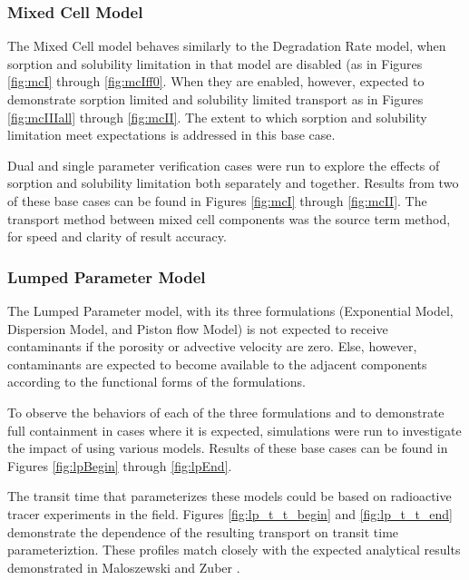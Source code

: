 \subsubsection{Mixed Cell Model}
The Mixed Cell model behaves similarly to the Degradation Rate 
model, when sorption and solubility limitation in that model are disabled (as 
in Figures \ref{fig:mcI} through \ref{fig:mcIff0}. When they are 
enabled, however, expected to demonstrate sorption limited and solubility 
limited transport as in Figures \ref{fig:mcIIIall} through \ref{fig:mcII}. The extent to which sorption and solubility limitation meet 
expectations is addressed in this base case.

Dual and single parameter verification cases were run to explore the effects of 
sorption and solubility limitation both separately and together.  Results from 
two of these base cases can be found in Figures \ref{fig:mcI} through 
\ref{fig:mcII}. The transport method between mixed cell components was the 
source term method, for speed and clarity of result accuracy.


\FloatBarrier

\subsubsection{Lumped Parameter Model}
The Lumped Parameter model, with its three formulations (Exponential Model, 
Dispersion Model, and Piston flow Model) is not expected to receive 
contaminants if the porosity or advective velocity are zero. Else, however, 
contaminants are expected to  become available to the adjacent components 
according to the functional forms of the formulations. 

To observe the behaviors of each of the three formulations and to demonstrate 
full containment in cases where it is expected, simulations were run to 
investigate the impact of using various models. Results of these base cases can be found in Figures 
\ref{fig:lpBegin} through \ref{fig:lpEnd}.



The transit time that parameterizes these models could be based on radioactive 
tracer experiments in the field. Figures \ref{fig:lp_t_t_begin} 
and \ref{fig:lp_t_t_end} demonstrate the dependence of the resulting transport on 
transit time parameteriztion. These profiles match closely with the expected 
analytical results demonstrated in Maloszewski and Zuber 
\cite{zuber_lumped_1985}.

